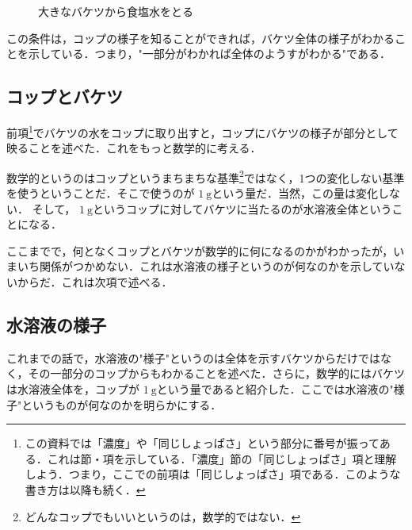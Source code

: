 \documentclass[dvipdfmx,18pt]{jsarticle}
\begin{document}
    \begin{figure}[htbp]\centering
        \caption{大きなバケツから食塩水をとる}
        \label{tikz_baketu_shokuensui_sub}
    \end{figure}

    この条件は，コップの様子を知ることができれば，バケツ全体の様子がわかることを示している．つまり，"一部分がわかれば全体のようすがわかる"である．

    \subsection{コップとバケツ}
    前項\footnote{この資料では「濃度」や「同じしょっぱさ」という部分に番号が振ってある．これは節・項を示している．「濃度」節の「同じしょっぱさ」項と理解しよう．つまり，ここでの前項は「同じしょっぱさ」項である．このような書き方は以降も続く．}でバケツの水をコップに取り出すと，コップにバケツの様子が部分として映ることを述べた．これをもっと数学的に考える．

    数学的というのはコップというまちまちな基準\footnote{どんなコップでもいいというのは，数学的ではない．}ではなく，1つの変化しない基準を使うということだ．そこで使うのが \(1\ \mathrm{g}\)という量だ．当然，この量は変化しない．
    そして， \(1\ \mathrm{g}\)というコップに対してバケツに当たるのが水溶液全体ということになる．

    ここまでで，何となくコップとバケツが数学的に何になるのかがわかったが，いまいち関係がつかめない．これは水溶液の様子というのが何なのかを示していないからだ．これは次項で述べる．

    \subsection{水溶液の様子}
    これまでの話で，水溶液の"様子"というのは全体を示すバケツからだけではなく，その一部分のコップからもわかることを述べた．さらに，数学的にはバケツは水溶液全体を，コップが \(1\ \mathrm{g}\)という量であると紹介した．ここでは水溶液の"様子"というものが何なのかを明らかにする．
\end{document}
